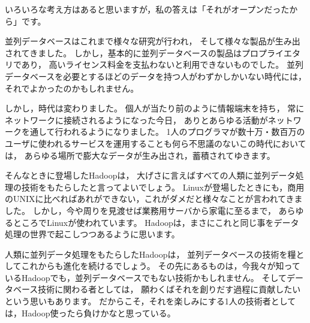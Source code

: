 いろいろな考え方はあると思いますが，私の答えは「それがオープンだったから」です。

並列データベースはこれまで様々な研究が行われ，
そして様々な製品が生み出されてきました。
しかし，基本的に並列データベースの製品はプロプライエタリであり，
高いライセンス料金を支払わないと利用できないものでした。
並列データベースを必要とするほどのデータを持つ人がわずかしかいない時代には，
それでよかったのかもしれません。

しかし，時代は変わりました。
個人が当たり前のように情報端末を持ち，
常にネットワークに接続されるようになった今日，
ありとあらゆる活動がネットワークを通して行われるようになりました。
1人のプログラマが数十万・数百万のユーザに使われるサービスを運用することも何ら不思議のないこの時代においては，
あらゆる場所で膨大なデータが生み出され，蓄積されてゆきます。

そんなときに登場したHadoopは，
大げさに言えばすべての人類に並列データ処理の技術をもたらしたと言ってよいでしょう。
Linuxが登場したときにも，商用のUNIXに比べればあれができない，これがダメだと様々なことが言われてきました。
しかし，今や周りを見渡せば業務用サーバから家電に至るまで，
あらゆるところでLinuxが使われています。
Hadoopは，まさにこれと同じ事をデータ処理の世界で起こしつつあるように思います。

人類に並列データ処理をもたらしたHadoopは，
並列データベースの技術を糧としてこれからも進化を続けるでしょう。
その先にあるものは，今我々が知っているHadoopでも，並列データベースでもない技術かもしれません。
そしてデータベース技術に関わる者としては，
願わくばそれを創りだす過程に貢献したいという思いもあります。
だからこそ，それを楽しみにする1人の技術者としては，Hadoop使ったら負けかなと思っている。
